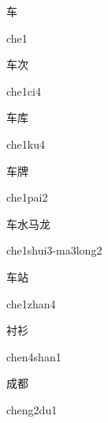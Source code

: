 \begin{verbete}[che1]{车}
\begin{pronuncia}{che1}
\end{pronuncia}
\end{verbete}

\begin{verbete}[che1ci4]{车次}
\begin{pronuncia}{che1ci4}
\end{pronuncia}
\end{verbete}

\begin{verbete}[che1ku4]{车库}
\begin{pronuncia}{che1ku4}
\end{pronuncia}
\end{verbete}

\begin{verbete}{车牌}
\begin{pronuncia}{che1pai2}
\end{pronuncia}
\end{verbete}

\begin{verbete}{车水马龙}
\begin{pronuncia}{che1shui3-ma3long2}
\end{pronuncia}
\end{verbete}

\begin{verbete}{车站}
\begin{pronuncia}{che1zhan4}
\end{pronuncia}
\end{verbete}

\begin{verbete}{衬衫}
\begin{pronuncia}{chen4shan1}
\end{pronuncia}
\end{verbete}

\begin{verbete}[cheng2du1]{成都}
\begin{pronuncia}{cheng2du1}
\end{pronuncia}
\end{verbete}

